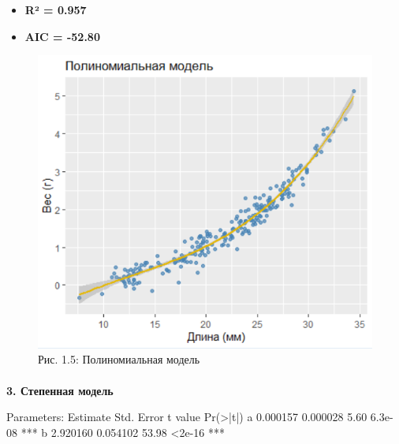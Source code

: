 \documentclass[
  letterpaper,
  DIV=11,
  numbers=noendperiod]{scrreprt}
\makeatletter
\let\oldparagraph\paragraph
\renewcommand{\paragraph}{
    \@ifstar
      \xxxParagraphStar
      \xxxParagraphNoStar
  }
\newcommand{\xxxParagraphStar}[1]{\oldparagraph*{#1}\mbox{}}
\newcommand{\xxxParagraphNoStar}[1]{\oldparagraph{#1}\mbox{}}
\newenvironment{Shaded}{\begin{snugshade}}{\end{snugshade}}
\newcommand{\ErrorTok}[1]{\textcolor[rgb]{0.68,0.00,0.00}{#1}}
\newcommand{\FloatTok}[1]{\textcolor[rgb]{0.68,0.00,0.00}{#1}}
\newcommand{\FunctionTok}[1]{\textcolor[rgb]{0.28,0.35,0.67}{#1}}
\newcommand{\NormalTok}[1]{\textcolor[rgb]{0.00,0.23,0.31}{#1}}
\newcommand{\SpecialCharTok}[1]{\textcolor[rgb]{0.37,0.37,0.37}{#1}}
\makeatother
\begin{document}
\begin{itemize}
\item
  \textbf{R² = 0.957}
\item
  \textbf{AIC = -52.80}
\end{itemize}

\begin{figure}[H]

{\centering \includegraphics[width=0.6\linewidth,height=\textheight,keepaspectratio]{images/poly_shrimp.PNG}

}

\caption{Рис. 1.5: Полиномиальная модель}

\end{figure}%

\paragraph{\texorpdfstring{\textbf{3. Степенная
модель}}{3. Степенная модель}}\label{ux441ux442ux435ux43fux435ux43dux43dux430ux44f-ux43cux43eux434ux435ux43bux44c}

\begin{Shaded}
\begin{Highlighting}[]
\NormalTok{Parameters}\SpecialCharTok{:}
\NormalTok{   Estimate Std. Error t value }\FunctionTok{Pr}\NormalTok{(}\SpecialCharTok{\textgreater{}}\ErrorTok{|}\NormalTok{t}\SpecialCharTok{|}\NormalTok{)    }
\NormalTok{a }\FloatTok{0.000157}   \FloatTok{0.000028}    \FloatTok{5.60}  \FloatTok{6.3e{-}08} \SpecialCharTok{**}\ErrorTok{*}
\NormalTok{b }\FloatTok{2.920160}   \FloatTok{0.054102}   \FloatTok{53.98}   \SpecialCharTok{\textless{}}\FloatTok{2e{-}16} \SpecialCharTok{**}\ErrorTok{*}
\end{Highlighting}
\end{Shaded}
\end{document}
